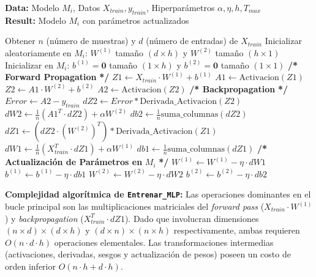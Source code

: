 \documentclass[11pt, a4paper]{article}
\begin{document}
\begin{algorithm}[H]
\caption{Entrenamiento del Perceptrón Multicapa (Entrenar\_MLP)}
\textbf{Data:} Modelo $M_i$, Datos $X_{train}, y_{train}$, Hiperparámetros $\alpha, \eta, h, T_{max}$\\
\textbf{Result:} Modelo $M_i$ con parámetros actualizados
\begin{algorithmic}[1]
    \State Obtener $n$ (número de muestras) y $d$ (número de entradas) de $X_{train}$
    \State Inicializar aleatoriamente en $M_i$: $W^{(1)}$ tamaño $(d \times h)$ y $W^{(2)}$ tamaño $(h \times 1)$
    \State Inicializar en $M_i$: $b^{(1)} = \mathbf{0}$ tamaño $(1 \times h)$ y $b^{(2)} = \mathbf{0}$ tamaño $(1 \times 1)$
    \Statex
        \State \textbf{/* Forward Propagation} \textbf{*/}
        \State $Z1 \gets X_{train} \cdot W^{(1)} + b^{(1)}$
        \State $A1 \gets \text{Activacion}(Z1)$
        \State $Z2 \gets A1 \cdot W^{(2)} + b^{(2)}$ 
        \State $A2 \gets \text{Activacion}(Z2)$
        \Statex
        \State \textbf{/* Backpropagation} \textbf{*/}
        \State $Error \gets A2 - y_{train}$
        \State $dZ2 \gets Error * \text{Derivada\_Activacion}(Z2)$
        \State $dW2 \gets \frac{1}{n} (A1^T \cdot dZ2) + \alpha W^{(2)}$
        \State $db2 \gets \frac{1}{n} \text{suma\_columnas}(dZ2)$
        \Statex
        \State $dZ1 \gets (dZ2 \cdot (W^{(2)})^T) * \text{Derivada\_Activacion}(Z1)$
        \State $dW1 \gets \frac{1}{n} (X_{train}^T \cdot dZ1) + \alpha W^{(1)}$
        \State $db1 \gets \frac{1}{n} \text{suma\_columnas}(dZ1)$
        \Statex
        \State \textbf{/* Actualización de Parámetros en} $M_i$ \textbf{*/}
        \State $W^{(1)} \gets W^{(1)} - \eta \cdot dW1$
        \State $b^{(1)} \gets b^{(1)} - \eta \cdot db1$
        \State $W^{(2)} \gets W^{(2)} - \eta \cdot dW2$
        \State $b^{(2)} \gets b^{(2)} - \eta \cdot db2$
    \EndFor
\end{algorithmic}
\end{algorithm}

\textbf{Complejidad algorítmica de \texttt{Entrenar\_MLP}:}
Las operaciones dominantes en el bucle principal son las multiplicaciones matriciales del \textit{forward pass} ($X_{train} \cdot W^{(1)}$) y \textit{backpropagation} ($X_{train}^T \cdot dZ1$). Dado que involucran dimensiones $(n \times d) \times (d \times h)$ y $(d \times n) \times (n \times h)$ respectivamente, ambas requieren $O(n \cdot d \cdot h)$ operaciones elementales. Las transformaciones intermedias (activaciones, derivadas, sesgos y actualización de pesos) poseen un costo de orden inferior $O(n \cdot h + d \cdot h)$.
    
\end{document}

